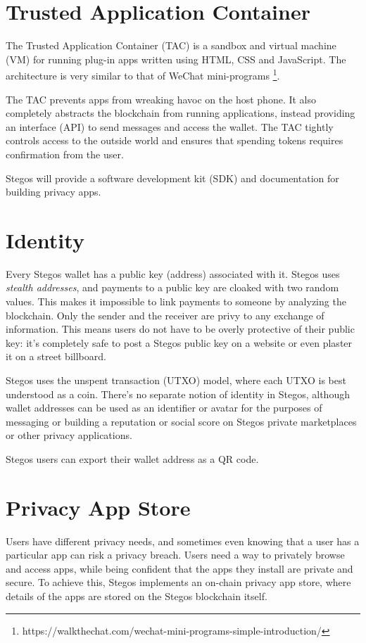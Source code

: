 \documentclass[8pt,fleqn,openany]{book}
\begin{document}
\section{Trusted Application Container}\label{sec:tac}
The Trusted Application Container (TAC) is a sandbox and virtual machine (VM) for running plug-in apps written using HTML, CSS and JavaScript. The architecture is very similar to that of WeChat mini-programs \footnote{https://walkthechat.com/wechat-mini-programs-simple-introduction/}.

The TAC prevents apps from wreaking havoc on the host phone. It also completely abstracts the blockchain from running applications, instead providing an interface (API) to send messages and access the wallet. The TAC tightly controls access to the outside world and ensures that spending tokens requires confirmation from the user. 

Stegos will provide a software development kit (SDK) and documentation for building privacy apps. 

\section{Identity}\label{sec:identity}
Every Stegos wallet has a public key (address) associated with it. Stegos uses \textit{stealth addresses}, and payments to a public key are cloaked with two random values. This makes it impossible to link payments to someone by analyzing the blockchain. Only the sender and the receiver are privy to any exchange of information. This means users do not have to be overly protective of their public key: it’s completely safe to post a Stegos public key on a website or even plaster it on a street billboard. 

Stegos uses the unspent transaction (UTXO) model, where each UTXO is best understood as a coin. There’s no separate notion of identity in Stegos, although wallet addresses can be used as an identifier or avatar for the purposes of messaging or building a reputation or social score on Stegos private marketplaces or other privacy applications. 

Stegos users can export their wallet address as a QR code.
	
\section{Privacy App Store}\label{sec:appstore}
Users have different privacy needs, and sometimes even knowing that a user has a particular app can risk a privacy breach. Users need a way to privately browse and access apps, while being confident that the apps they install are private and secure. To achieve this, Stegos implements an on-chain privacy app store, where details of the apps are stored on the Stegos blockchain itself.
\end{document}
